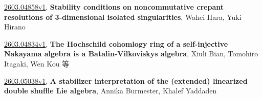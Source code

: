 \documentclass[9pt, a4paper]{article}
\theoremstyle{plain}
\theoremstyle{definition}
\theoremstyle{remark}
\newcommand{\arxiv}[3]{\href{https://arxiv.org/abs/#1}{#1}, \textbf{\textcolor{arxivblue}{#2}}, #3}
\begin{document}
\arxiv{2603.04858v1}{Stability conditions on noncommutative crepant resolutions of 3-dimensional isolated singularities}{Wahei Hara, Yuki Hirano}

\arxiv{2603.04834v1}{The Hochschild cohomlogy ring of a self-injective Nakayama algebra is a Batalin-Vilkoviskys algebra}{Xiuli Bian, Tomohiro Itagaki, Wen Kou 等}

\arxiv{2603.05038v1}{A stabilizer interpretation of the (extended) linearized double shuffle Lie algebra}{Annika Burmester, Khalef Yaddaden}

\end{document}
